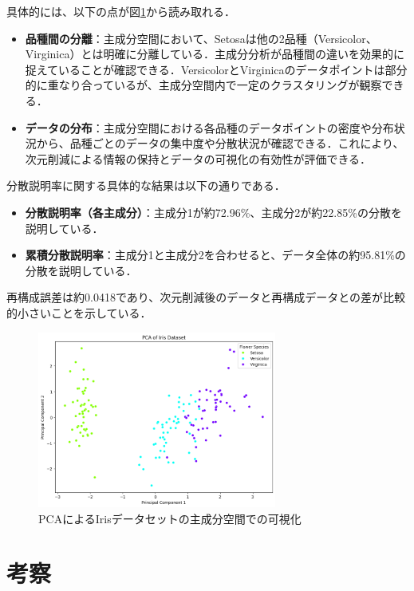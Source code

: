 \documentclass[dvipdfmx,titlepage,a4j]{jsarticle}
\begin{document}
具体的には、以下の点が図\ref{fig:sim}から読み取れる．
\begin{itemize}
    \item \textbf{品種間の分離}：主成分空間において、Setosaは他の2品種（Versicolor、Virginica）とは明確に分離している．主成分分析が品種間の違いを効果的に捉えていることが確認できる．VersicolorとVirginicaのデータポイントは部分的に重なり合っているが、主成分空間内で一定のクラスタリングが観察できる．
    \item \textbf{データの分布}：主成分空間における各品種のデータポイントの密度や分布状況から、品種ごとのデータの集中度や分散状況が確認できる．これにより、次元削減による情報の保持とデータの可視化の有効性が評価できる．
\end{itemize}

分散説明率に関する具体的な結果は以下の通りである．
\begin{itemize}
    \item \textbf{分散説明率（各主成分）}：主成分1が約72.96\%、主成分2が約22.85\%の分散を説明している．
    \item \textbf{累積分散説明率}：主成分1と主成分2を合わせると、データ全体の約95.81\%の分散を説明している．
\end{itemize}

再構成誤差は約0.0418であり、次元削減後のデータと再構成データとの差が比較的小さいことを示している．

\begin{figure}[H]
    \centering
    \includegraphics[width=0.7\textwidth]{picture/sim.png}
    \caption{PCAによるIrisデータセットの主成分空間での可視化}
    \label{fig:sim}
\end{figure}

\section{考察}
\end{document}
